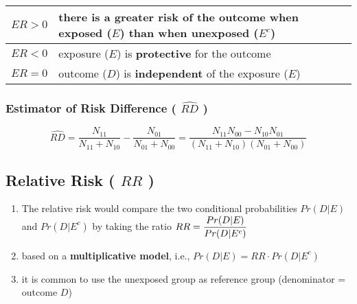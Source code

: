 \begin{customTableWrapper}{1.5}
\begin{table}[H]
    \centering
    \begin{tabular}{|l|p{9cm}|}
        \hline

        $ER > 0$ & there is a greater risk of the outcome when exposed ($E$) than when unexposed ($E^c$) \\
        \hline

        $ER < 0$ & exposure ($E$) is \textbf{protective} for the outcome \\
        \hline

        $ER = 0$ & outcome ($D$) is \textbf{independent} of the exposure ($E$) \\
        \hline

    \end{tabular}
\end{table}
\end{customTableWrapper}

\subsubsection{Estimator of Risk Difference ( $\hat{RD}$ ) \cite{ism-1}}\label{Estimator of Risk Difference}

\[
    \hat{RD} 
    = \dfrac{N_{11}}{N_{11} + N_{10}} - \dfrac{N_{01}}{N_{01} + N_{00}}
    = \dfrac{N_{11}N_{00} - N_{10}N_{01}}{(N_{11} + N_{10})(N_{01} + N_{00})}
\]


\subsection{Relative Risk ( $RR$ ) \cite{ism-1}}\label{Relative Risk}

\begin{enumerate}[itemsep=0.2cm]
    \item The relative risk would compare the two conditional probabilities $Pr (D|E)$ and $Pr (D|E^c)$ by taking the ratio 
    $   
        \hfill
        RR = \dfrac{Pr (D|E)}{Pr (D|E^c)} 
        \hfill
    $

    \item based on a \textbf{multiplicative model}, i.e., $Pr (D|E) = RR \cdot Pr (D|E^c)$

    \item it is common to use the unexposed group as reference group (denominator = outcome $D$)

\end{enumerate}


